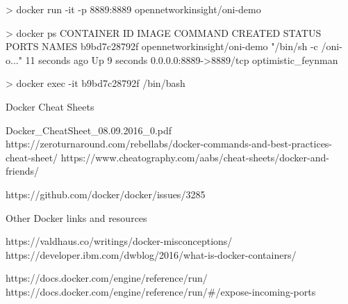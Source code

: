 \documentclass[11pt]{article}
\begin{document}
> docker run -it -p 8889:8889 opennetworkinsight/oni-demo

> docker ps
CONTAINER ID        IMAGE                         COMMAND                  CREATED             STATUS              PORTS                    NAMES
b9bd7c28792f        opennetworkinsight/oni-demo   "/bin/sh -c /oni-o..."   11 seconds ago      Up 9 seconds        0.0.0.0:8889->8889/tcp   optimistic_feynman

> docker exec -it b9bd7c28792f /bin/bash


Docker Cheat Sheets

Docker_CheatSheet_08.09.2016_0.pdf
https://zeroturnaround.com/rebellabs/docker-commands-and-best-practices-cheat-sheet/
https://www.cheatography.com/aabs/cheat-sheets/docker-and-friends/

https://github.com/docker/docker/issues/3285



Other Docker links and resources

https://valdhaus.co/writings/docker-misconceptions/
https://developer.ibm.com/dwblog/2016/what-is-docker-containers/


https://docs.docker.com/engine/reference/run/
https://docs.docker.com/engine/reference/run/#/expose-incoming-ports
\end{document}
